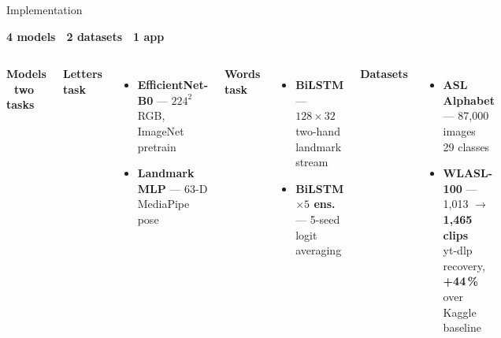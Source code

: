 \documentclass[aspectratio=169,11pt]{beamer}
\newcommand{\hl}[1]{\textcolor{TealDark}{\textbf{#1}}}
\begin{document}
\begin{frame}{Implementation}
  \begin{center}
    {\normalsize \hl{4 models} \,\textperiodcentered\, \hl{2 datasets} \,\textperiodcentered\, \hl{1 app}}
  \end{center}

  \vspace{0.10cm}
  \begin{columns}[T,onlytextwidth]
      \scriptsize\bfseries\color{Teal}Models \,\textperiodcentered\, two tasks\\[3pt]
      \scriptsize

      \textbf{\color{TealDark}Letters task}\\[1pt]
      \begin{itemize}\setlength{\itemsep}{1pt}\setlength{\topsep}{0pt}\setlength{\leftskip}{-8pt}
        \item \textbf{EfficientNet-B0} --- $224^2$ RGB, ImageNet pretrain
        \item \textbf{Landmark MLP} --- 63-D MediaPipe pose
      \end{itemize}
      \vspace{2pt}
      \textbf{\color{TealDark}Words task}\\[1pt]
      \begin{itemize}\setlength{\itemsep}{1pt}\setlength{\topsep}{0pt}\setlength{\leftskip}{-8pt}
        \item \textbf{BiLSTM} --- $128{\times}32$ two-hand landmark stream
        \item \textbf{BiLSTM $\times 5$ ens.} --- 5-seed logit averaging
      \end{itemize}

      \vspace{0.12cm}
      \scriptsize\bfseries\color{Teal}Datasets\\[2pt]
      \scriptsize
      \begin{itemize}\setlength{\itemsep}{1pt}\setlength{\topsep}{0pt}\setlength{\leftskip}{-8pt}
        \item \textbf{ASL Alphabet} --- 87{,}000 images \,\textperiodcentered\, 29 classes
        \item \textbf{WLASL-100} --- 1{,}013 $\rightarrow$ \hl{1{,}465 clips} \\
              {\tiny yt-dlp recovery, \hl{+44\,\%} over Kaggle baseline}
      \end{itemize}


\end{columns}
\end{frame}
\end{document}
